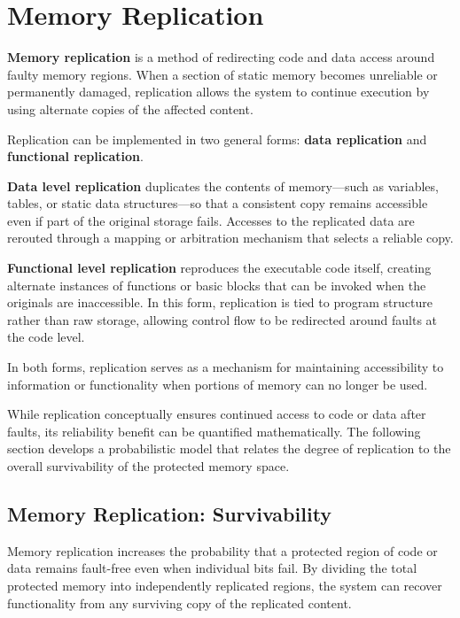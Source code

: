 \chapter{Memory Replication}
\label{chap:memory-replication}

\textbf{Memory replication} is a method of redirecting code and data access around faulty memory regions. When a section of static memory becomes unreliable or permanently damaged, replication allows the system to continue execution by using alternate copies of the affected content.  

Replication can be implemented in two general forms: \textbf{data replication} and \textbf{functional replication}.  

\textbf{Data level replication} duplicates the contents of memory---such as variables, tables, or static data structures---so that a consistent copy remains accessible even if part of the original storage fails. Accesses to the replicated data are rerouted through a mapping or arbitration mechanism that selects a reliable copy.  

\textbf{Functional level replication} reproduces the executable code itself, creating alternate instances of functions or basic blocks that can be invoked when the originals are inaccessible. In this form, replication is tied to program structure rather than raw storage, allowing control flow to be redirected around faults at the code level.  

In both forms, replication serves as a mechanism for maintaining accessibility to information or functionality when portions of memory can no longer be used.  

While replication conceptually ensures continued access to code or data after faults, 
its reliability benefit can be quantified mathematically. 
The following section develops a probabilistic model that relates 
the degree of replication to the overall survivability of the protected memory space.


\section{Memory Replication: Survivability}
\label{sec:mem-rep-survivability}

Memory replication increases the probability that a protected region of code or data 
remains fault-free even when individual bits fail. By dividing the total protected memory 
into independently replicated regions, the system can recover functionality from any 
surviving copy of the replicated content.

